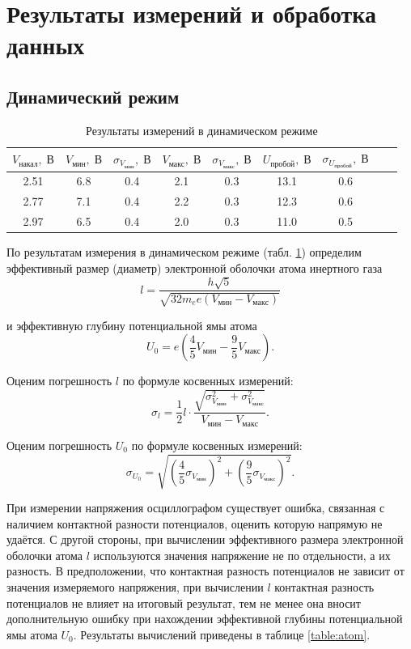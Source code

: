 \documentclass[a4paper, 12pt]{article}
\newcommand{\V}{\; В}
\begin{document}
    \section{Результаты измерений и обработка данных}
    
    \subsection{Динамический режим}

    \begin{table}[H]
        \centering
        \begin{tabular}{ccccccccc}
            \toprule
            $V_{\text{накал}}, \V$ & $V_{\text{мин}}, \V$ & $\sigma_{V_{\text{мин}}}, \V$ & $V_{\text{макс}}, \V$ & $\sigma_{V_{\text{макс}}}, \V$ & $U_{\text{пробой}}, \V$ & $\sigma_{U_{\text{пробой}}}, \V$ \\ \midrule
            2.51 & 6.8 & 0.4 & 2.1 & 0.3 & 13.1 & 0.6 \\
            2.77 & 7.1 & 0.4 & 2.2 & 0.3 & 12.3 & 0.6 \\
            2.97 & 6.5 & 0.4 & 2.0 & 0.3 & 11.0 & 0.5 \\
            \toprule
        \end{tabular}
        \caption{Результаты измерений в динамическом режиме}
        \label{table:dynamic}
    \end{table}

    По результатам измерения в динамическом режиме (табл. \ref{table:dynamic}) определим эффективный размер (диаметр) электронной оболочки атома инертного газа
    $$
    l = \frac{h\sqrt{5}}{\sqrt{32 m_e e (V_{мин} - V_{макс})}}
    $$
    
    и эффективную глубину потенциальной ямы атома
    $$
    U_0 = e \left(\frac{4}{5} V_{мин} - \frac{9}{5} V_{макс} \right).
    $$
    
    Оценим погрешность $l$ по формуле косвенных измерений:
    $$
    \sigma_l = \frac{1}{2} l \cdot \frac{\sqrt{\sigma_{V_{мин}}^2 + \sigma_{V_{макс}}^2}}{V_{мин} - V_{макс}}.
    $$
	
    Оценим погрешность $U_0$ по формуле косвенных измерений:
    $$
    \sigma_{U_0} = \sqrt{\left(\frac{4}{5} \sigma_{V_{мин}}\right)^2 + \left(\frac{9}{5} \sigma_{V_{макс}}\right)^2}.
    $$
    	
    При измерении напряжения осциллографом существует ошибка, связанная с наличием контактной разности потенциалов, оценить которую напрямую не удаётся. С другой стороны, при вычислении эффективного размера электронной оболочки атома $l$ используются значения напряжение не по отдельности, а их разность. В предположении, что контактная разность потенциалов не зависит от значения измеряемого напряжения, при вычислении $l$ контактная разность потенциалов не влияет на итоговый результат, тем не менее она вносит дополнительную ошибку при нахождении эффективной глубины потенциальной ямы атома $U_0$. Результаты вычислений приведены в таблице \ref{table:atom}.
	
\end{document}
